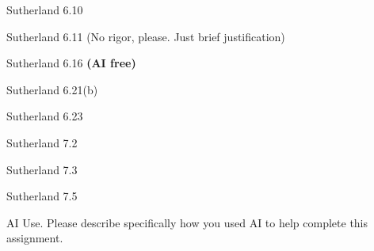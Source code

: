 \documentclass[minion]{homework}
\begin{document}
\begin{problems}

\problem Sutherland 6.10

\problem Sutherland 6.11 (No rigor, please. Just brief justification)

\problem Sutherland 6.16 \textbf{(AI free)}

\problem Sutherland 6.21(b)

\problem Sutherland 6.23

\problem Sutherland 7.2

\problem Sutherland 7.3

\problem Sutherland 7.5

\problem AI Use. Please describe specifically how you used AI to help complete this assignment.

\end{problems}
\end{document}

